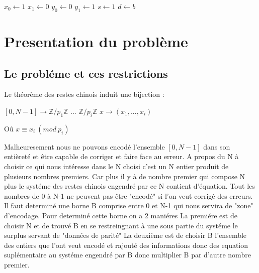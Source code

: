 \documentclass[a4paper, 11pt]{report}
\begin{document}
\begin{algorithm}
    $x_0 \leftarrow 1 $ \;
    $x_1 \leftarrow 0 $ \;
    $y_0 \leftarrow 0 $ \;
    $y_1 \leftarrow 1 $ \;
    $s \leftarrow 1 $ \;
    $d \leftarrow b $ \;
\end{algorithm}
\newpage

\chapter{Presentation du problème}
\section{Le probléme et ces restrictions}
Le théorème des restes chinois induit une bijection :
\newline

$[0,N-1] \rightarrow \mathbb{Z}/p_1\mathbb{Z}$ \times  ... \times  $ \mathbb{Z}/p_i\mathbb{Z} $  \newline
$x \rightarrow (x_1,...,x_i) $ 

\newline
\newline

Oû $ x\equiv x_i \: (mod \: p_i)$
\newline

Malheuresement nous ne pouvons encodé l'ensemble $[0,N-1]$ dans son entièreté et être capable de corriger et faire face au erreur.\newline
A  propos du N à choisir ce qui nous intéresse dans le N choisi c'est un N entier produit de plusieurs nombres premiers.\newline 
Car plus il y à de nombre premier qui compose N plus le systéme des restes chinois engendré par ce N contient d'équation.  \newline
Tout les nombres de 0 à N-1 ne peuvent pas être "encodé" si l'on veut corrigé des erreurs.\newline
Il faut determiné une borne B comprise entre 0 et N-1 qui nous servira de "zone" d'encodage.\newline
Pour determiné cette borne on a 2 maniéres \newline
La premiére est de choisir N et de trouvé B en se restreingnant à une sous partie du systéme le surplus servant de "données de parité"\newline
La deuxième est de choisir B l'ensemble des entiers que l'ont veut encodé et rajouté des informations donc des equation suplémentaire au systéme engendré par B donc multiplier B par d'autre nombre premier.\newline
\end{document}
